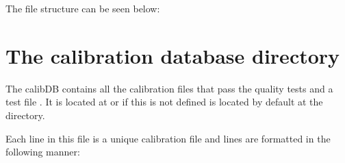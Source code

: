 \noindent The file structure can be seen below:
\begin{tcustomdir}
\end{tcustomdir}

\clearpage
\newpage
\section{The calibration database directory}
\label{ch:data_architecture:calibDB}
\begin{tcustomdir}
\end{tcustomdir}
\noindent The calibDB contains all the calibration files that pass the quality tests and a test file \masterCALIBDBfile. It is located at  or if this is not defined is located by default at the  directory.

\noindent Each line in this file is a unique calibration file and lines are formatted in the following manner:


